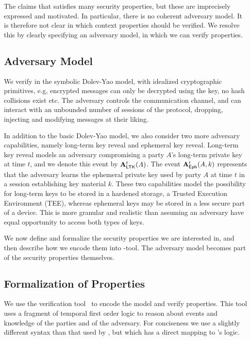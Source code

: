 The \mEdhoc{} \mSpec{} \cite{our-analysis-selander-lake-edhoc-00} claims
that \mEdhoc{} satisfies many security properties, but these are imprecisely
expressed and motivated.
%
In particular, there is no coherent adversary model.
%
It is therefore not clear in which context properties should be verified.
%
We resolve this by clearly specifying an adversary model, in which we can verify
properties.
%

%

\subsection{Adversary Model}\label{sec:threat-model}
We verify \mEdhoc{} in the symbolic Dolev-Yao model, with idealized
cryptographic primitives, e.g, encrypted messages can only be
decrypted using the key, no hash collisions exist etc.
%
The adversary controls the
communication channel, and can interact with an unbounded number of sessions
of the protocol, dropping, injecting and modifying messages at their liking.
%

In addition to the basic Dolev-Yao model, we also consider two more adversary
capabilities, namely long-term key reveal and ephemeral key reveal.
%
Long-term key reveal models an adversary compromising a party $A$'s
long-term private key  at time $t$, and we denote this event by
$\mathbf{A}_{\textsf{LTK}}^t(A)$.
%
The event $\mathbf{A}_{\textsf{Eph}}^t(A, k)$ represents that the adversary learns
the ephemeral private key  used by party $A$ at time $t$ in a session
establishing key material $k$.
%
These two capabilities model the possibility for long-term keys to be stored in a
hardened storage, a Trusted Execution Environment (TEE), whereas ephemeral keys
may be stored in a less secure part of a device.
%
This is more granular and realistic than assuming an adversary have equal
opportunity to access both types of keys.
%

We now define and formalize the security properties we are interested in, and
then describe how we encode them into \mTamarin{}-tool.
%
The adversary model becomes part of the security properties themselves.
%

\subsection{Formalization of Properties}
\label{sec:desired-properties}
%
We use the \mTamarin{} verification
tool~\cite{DBLP:conf/cav/MeierSCB13} to encode the model and verify properties.
%
This tool uses a fragment of temporal first order logic to reason about
events and knowledge of the parties and of the adversary.
%
For conciseness we use a slightly different syntax than
that used by \mTamarin{}, but which has a direct mapping to \mTamarin{}'s logic.
%

